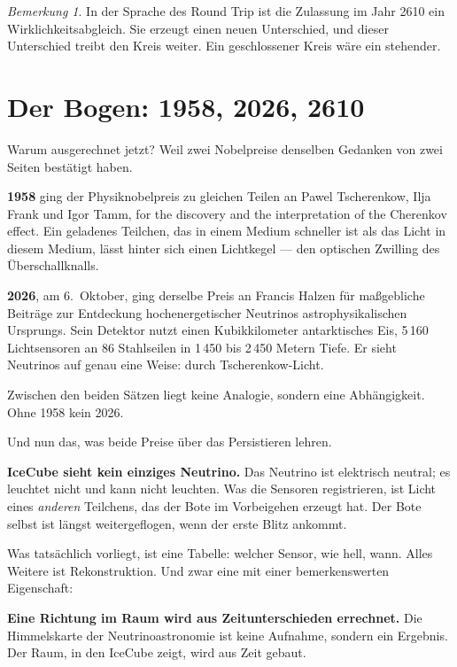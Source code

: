 \documentclass[11pt,a4paper]{article}
\theoremstyle{remark}
\newtheorem{bemerkung}{Bemerkung}[section]
\newcommand{\statusbox}[2]{%
  \par\medskip\noindent
  \colorbox{#1}{\parbox{\dimexpr\linewidth-2\fboxsep\relax}{#2}}%
  \par\medskip
}
\begin{document}
\begin{bemerkung}
In der Sprache des Round Trip ist die Zulassung im Jahr 2610 ein
Wirklichkeitsabgleich. Sie erzeugt einen neuen Unterschied, und dieser
Unterschied treibt den Kreis weiter. Ein geschlossener Kreis wäre ein
stehender.
\end{bemerkung}

\section{Der Bogen: 1958, 2026, 2610}

Warum ausgerechnet jetzt? Weil zwei Nobelpreise denselben Gedanken von zwei
Seiten bestätigt haben.

\textbf{1958} ging der Physiknobelpreis zu gleichen Teilen an Pawel
Tscherenkow, Ilja Frank und Igor Tamm, \glqq for the discovery and the
interpretation of the Cherenkov effect\grqq. Ein geladenes Teilchen, das in
einem Medium schneller ist als das Licht in diesem Medium, lässt hinter sich
einen Lichtkegel --- den optischen Zwilling des Überschallknalls.

\textbf{2026}, am 6.~Oktober, ging derselbe Preis an Francis Halzen für
maßgebliche Beiträge zur Entdeckung hochenergetischer Neutrinos
astrophysikalischen Ursprungs. Sein Detektor nutzt einen Kubikkilometer
antarktisches Eis, 5\,160 Lichtsensoren an 86 Stahlseilen in 1\,450 bis
2\,450 Metern Tiefe. Er sieht Neutrinos auf genau eine Weise: durch
Tscherenkow-Licht.

Zwischen den beiden Sätzen liegt keine Analogie, sondern eine Abhängigkeit.
Ohne 1958 kein 2026.

Und nun das, was beide Preise über das Persistieren lehren.

\textbf{IceCube sieht kein einziges Neutrino.} Das Neutrino ist elektrisch
neutral; es leuchtet nicht und kann nicht leuchten. Was die Sensoren
registrieren, ist Licht eines \emph{anderen} Teilchens, das der Bote im
Vorbeigehen erzeugt hat. Der Bote selbst ist längst weitergeflogen, wenn der
erste Blitz ankommt.

Was tatsächlich vorliegt, ist eine Tabelle: welcher Sensor, wie hell, wann.
Alles Weitere ist Rekonstruktion. Und zwar eine mit einer bemerkenswerten
Eigenschaft:

\statusbox{QLight}{
  \textbf{Eine Richtung im Raum wird aus Zeitunterschieden errechnet.}
  Die Himmelskarte der Neutrinoastronomie ist keine Aufnahme, sondern ein
  Ergebnis. Der Raum, in den IceCube zeigt, wird aus Zeit gebaut.
}
\end{document}
